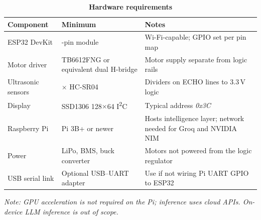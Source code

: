 \begin{table}[H]
\centering
\caption[Hardware requirements]{\textbf{Hardware requirements}}
\label{tab:hw_req}
\begin{tabularx}{\textwidth}{|>{\raggedright\arraybackslash}p{3.2cm}|>{\raggedright\arraybackslash}X|>{\raggedright\arraybackslash}X|}
\hline
\textbf{Component} & \textbf{Minimum} & \textbf{Notes} \\
\hline
ESP32 DevKit & 38-pin module & Wi-Fi-capable; GPIO set per pin map \\
\hline
Motor driver & TB6612FNG or equivalent dual H-bridge & Motor supply separate from logic rails \\
\hline
Ultrasonic sensors & 3$\times$ HC-SR04 & Dividers on ECHO lines to 3.3\,V logic \\
\hline
Display & SSD1306 128$\times$64 I\textsuperscript{2}C & Typical address \textit{0x3C} \\
\hline
Raspberry Pi & Pi 3B+ or newer & Hosts intelligence layer; network needed for Groq and NVIDIA NIM \\
\hline
Power & LiPo, BMS, buck converter & Motors not powered from the logic regulator \\
\hline
USB serial link & Optional USB--UART adapter & Use if not wiring Pi UART GPIO to ESP32 \\
\hline
\end{tabularx}
\end{table}

\textit{Note: GPU acceleration is not required on the Pi; inference uses cloud APIs. On-device LLM inference is out of scope.}


